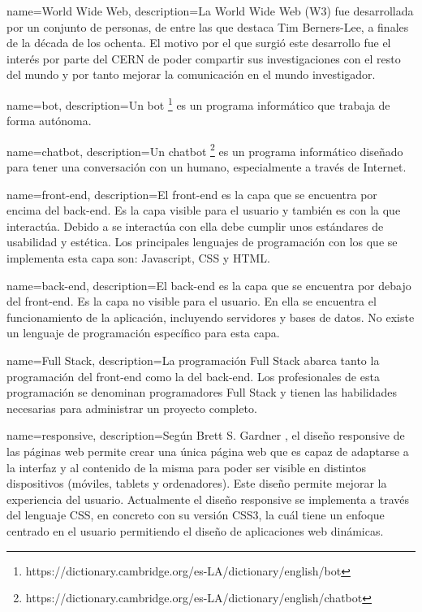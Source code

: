 
\makeglossaries


{
    name=World Wide Web,
    description={La World Wide Web (W3) fue desarrollada por un conjunto de personas, de entre las que destaca Tim Berners-Lee, a finales de la década de los ochenta. El motivo por el que surgió este desarrollo fue el interés por parte del CERN de poder compartir sus investigaciones con el resto del mundo y por tanto mejorar la comunicación en el mundo investigador.}
}

{
    name=bot,
    description={Un bot \footnote{https://dictionary.cambridge.org/es-LA/dictionary/english/bot} es un programa informático que trabaja de forma autónoma.}
}

{
    name=chatbot,
    description={Un chatbot \footnote{https://dictionary.cambridge.org/es-LA/dictionary/english/chatbot} es un programa informático diseñado para tener una conversación con un humano, especialmente a través de Internet.}
}

{
    name=front-end,
    description={El front-end es la capa que se encuentra por encima del \gls{back-end}. Es la capa visible para el usuario y también es con la que interactúa. Debido a se interactúa con ella debe cumplir unos estándares de usabilidad y estética. Los principales lenguajes de programación con los que se implementa esta capa son: Javascript, CSS y HTML.}
}

{
    name=back-end,
    description={El back-end es la capa que se encuentra por debajo del \gls{front-end}. Es la capa no visible para el usuario. En ella se encuentra el funcionamiento de la aplicación, incluyendo servidores y bases de datos. No existe un lenguaje de programación específico para esta capa.}
}

{
    name=Full Stack,
    description={La programación Full Stack abarca tanto la programación del \gls{front-end} como la del \gls{back-end}. Los profesionales de esta programación se denominan programadores Full Stack y tienen las habilidades necesarias para administrar un proyecto completo.}
}

{
    name=responsive,
    description={Según Brett S. Gardner \cite{RefWorks:RefID:34-2011responsive}, el diseño responsive de las páginas web permite crear una única página web que es capaz de adaptarse a la interfaz y al contenido de la misma para poder ser visible en distintos dispositivos (móviles, tablets y ordenadores). Este diseño permite mejorar la experiencia del usuario. Actualmente el diseño responsive se implementa a través del lenguaje CSS, en concreto con su versión CSS3, la cuál tiene un enfoque centrado en el usuario permitiendo el diseño de aplicaciones web dinámicas.}
}

